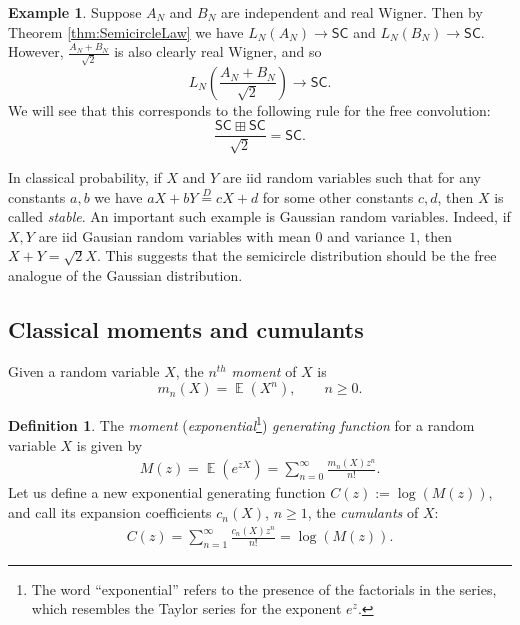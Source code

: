 \documentclass[letterpaper,11pt,oneside,reqno]{amsart}
\numberwithin{equation}{section}
\newcommand{\SC}{\mathsf{SC}}
\DeclareMathOperator{\EE}{\mathbb{E}}
\theoremstyle{definition}
\newtheorem{definition}[proposition]{Definition}
\newtheorem{example}[proposition]{Example}
\begin{document}
\begin{example}
	Suppose $A_N$ and $B_N$ are independent and real Wigner. 
	Then by Theorem \ref{thm:SemicircleLaw} we have
	$L_N(A_N)\to \SC$ and $L_N(B_N)\to \SC$. However, 
	$\displaystyle\frac{A_N+B_N}{\sqrt{2}}$ is also clearly real Wigner, and so
	\begin{equation*}
		L_N\left(\frac{A_N+B_N}{\sqrt{2}}\right) \to \SC.
	\end{equation*}
	We will see that this corresponds to the following
	rule for the free convolution:
	\begin{equation*}
		\frac{\SC\boxplus\SC}{\sqrt{2}}=\SC.
	\end{equation*}

	In classical probability, if $X$ and $Y$ are iid random variables 
	such that for any constants $a,b$ we have 
	$aX+bY\stackrel{D}{=} cX+d$ for some other constants $c,d$, then $X$ is called
	\emph{stable}. An important such example is Gaussian random variables.
	Indeed, if  $X,Y$ are iid Gausian random variables with mean $0$
	and variance $1$, then
	$X+Y=\sqrt{2}X$.  
	This suggests that the semicircle distribution should
	be the free analogue of the Gaussian distribution.
\end{example}


\subsection{Classical moments and cumulants} %
\label{sub:classical_moments_and_cumulants}

Given a random variable $X$, the $n^{th}$ \emph{moment} of $X$ is
\begin{equation*}
	m_n(X)=\EE(X^n),\qquad n\geq 0.
\end{equation*}

\begin{definition}
The \emph{moment} (\emph{exponential}\footnote{The word
``exponential'' refers to the presence of the factorials in the series, which
resembles the Taylor series for the exponent $e^{z}$.}) \emph{generating function} for a random variable $X$ is given by 
\begin{align}\label{Moment_Gen}
\displaystyle M(z)=\EE (e^{z X})=\sum_{n=0}^\infty \frac{m_n(X)z^n}{n!}.
\end{align}
Let us define a new exponential generating function $C(z):=\log(M(z))$, and call its expansion coefficients $c_n(X)$, $n\ge1$,
the \emph{cumulants} of $X$:
\begin{align}\label{Cumulant_Gen}
\displaystyle C(z)=\sum_{n=1}^\infty \frac{c_n(X)z^n}{n!}=\log(M(z)).
\end{align}
\end{definition}
\end{document}
